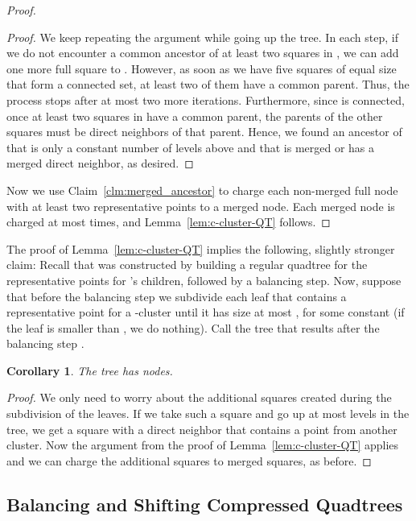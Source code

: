 \documentclass[11pt]{paper}
\newtheorem {cor}[theorem] {Corollary}
\begin{document}
\begin{proof}
\begin{proof}
      We keep repeating the argument while going up the tree. 
      In each step, if we do not encounter a common ancestor of
      at least two squares in ,
      we can add one more full square to .
      However, as soon as we have five squares of equal size
      that form a connected set, at least two of them have a common
      parent. Thus, the process stops after at most two more
      iterations. Furthermore, since  is connected, once at least two 
      squares in  have a common parent, the parents of the other
      squares must be direct neighbors of that parent. Hence, 
      we found an ancestor of  that is
      only a constant number of levels above  and that is merged
      or has a merged direct neighbor, as desired.
      \end{proof}
      
      Now we use Claim~\ref{clm:merged_ancestor} to charge
      each non-merged full node with at least two representative points
      to a merged node.
      Each merged node is charged at most 
       times, and Lemma~\ref{lem:c-cluster-QT} 
      follows.
      \end{proof}

  The proof of Lemma~\ref{lem:c-cluster-QT} implies the following, slightly
  stronger claim: Recall that  was constructed by building
  a regular quadtree for the representative points for 's children,
  followed by a balancing step. Now, suppose that before the balancing
  step we subdivide each leaf that contains a representative
  point for a -cluster  until it has size at 
  most , for some constant  (if the 
  leaf is smaller than , we do nothing).
  Call the tree that results after the balancing step .
  \begin{cor}\label{cor:c-cluster-QT-extended}
      The tree  has  nodes.
  \end{cor}

  \begin{proof}
    We only need to worry about the additional squares created during the
    subdivision of the leaves. If we take such a square and go up
    at most  levels in the tree, we get a square with a direct
    neighbor that contains a point from another cluster. Now the 
    argument from the proof of Lemma~\ref{lem:c-cluster-QT} applies
    and we can charge the additional squares to merged squares, as before.
  \end{proof}
  \subsection{Balancing and Shifting Compressed Quadtrees}
    \label{sec:shiftbalance}
\end{document}
